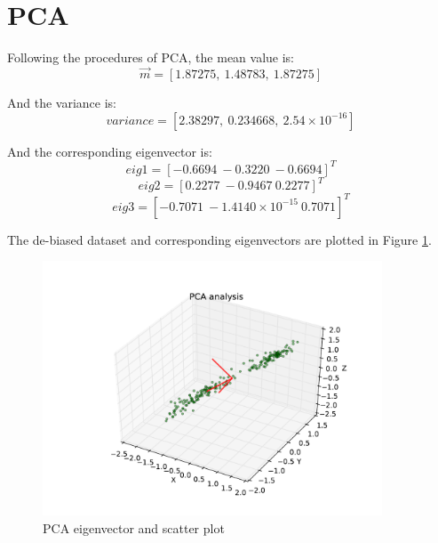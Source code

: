 

\usepackage{graphicx, amssymb, amsmath, listings, float, mathtools}
\usepackage{color, url}
\lstset{language = Python}
\lstset{breaklines}
\lstset{extendedchars=false}

\oddsidemargin 0in
\evensidemargin 0in
\textwidth 6.5in
\topmargin -0.6in
\textheight 9.0in




\section{\large PCA}

Following the procedures of PCA, the mean value is:
$$\vec{m} = [1.87275, \  1.48783, \  1.87275]$$

And the variance is:
$$variance = [2.38297, \  0.234668, \  2.54 \times 10^{-16}]$$

And the corresponding eigenvector is: 
$$eig1 = [-0.6694 \ -0.3220 \  -0.6694]^T$$
$$eig2 = [0.2277 \  -0.9467 \  0.2277]^T$$
$$eig3 = [-0.7071 \  -1.4140 \times 10^{-15} \  0.7071]^T$$


The de-biased dataset and corresponding eigenvectors are plotted in Figure \ref{fig:3d}.

\begin{figure}[H]
\centering
\includegraphics[width=0.9\textwidth]{./figures/3d.pdf}
\caption{\label{fig:3d} PCA eigenvector and scatter plot}
\end{figure}


